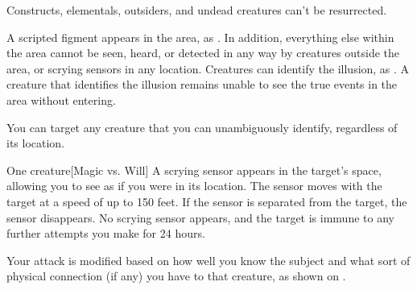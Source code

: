 Constructs, elementals, outsiders, and undead creatures can't be resurrected.

\spelldur{\durext}
\spellline
\spelleffect A scripted figment appears in the area, as . In addition, everything else within the area cannot be seen, heard, or detected in any way by creatures outside the area, or scrying sensors in any location.
\spellnotes Creatures can identify the illusion, as . A creature that identifies the illusion remains unable to see the true events in the area without entering.

\spelldur{\durmed \dismissable}
\spellspecial You can target any creature that you can unambiguously identify, regardless of its location.
\begin{spelltarget}{One creature}[Magic vs. Will]
    \spellsuccess A scrying sensor appears in the target's space, allowing you to see as if you were in its location. The sensor moves with the target at a speed of up to 150 feet. If the sensor is separated from the target, the sensor disappears.
    \spellfailure No scrying sensor appears, and the target is immune to any further attempts you make for 24 hours.

    \spellspecial Your attack is modified based on how well you know the subject and what sort of physical connection (if any) you have to that creature, as shown on .
\end{spelltarget}
\spellnotes \sensorspellnotes
